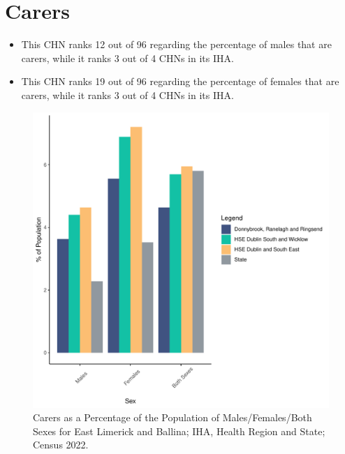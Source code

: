 \documentclass{article}
\begin{document}
\section{Carers}\label{sect:Carers}
\begin{itemize}
\item This CHN ranks  12 out of 96 regarding the percentage of males that are carers, while it ranks   3 out of 4 CHNs in its IHA.
\item This CHN ranks  19 out of 96 regarding the percentage of females that are carers, while it ranks   3 out of 4 CHNs in its IHA.
\end{itemize}
\begin{figure}[H]
	\centering
	\includegraphics[width = 150mm]{../figures/CareED.pdf}
	\caption{Carers as a Percentage of the Population of Males/Females/Both Sexes for East Limerick and Ballina; IHA, Health Region and State; Census 2022.}
	\label{fig:2ae19629-1a6a-13a3-e055-000000000001}
	\end{figure}
\end{document}
